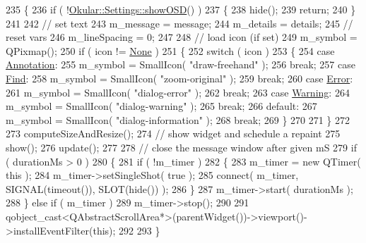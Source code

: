 \begin{DoxyCode}
235 \{
236     \textcolor{keywordflow}{if} ( !\hyperlink{classOkular_1_1Settings_ab6a3d4459b9ef5fa47cc7083968da797}{Okular::Settings::showOSD}() )
237     \{
238         hide();
239         \textcolor{keywordflow}{return};
240     \}
241 
242     \textcolor{comment}{// set text}
243     m\_message = message;
244     m\_details = details;
245     \textcolor{comment}{// reset vars}
246     m\_lineSpacing = 0;
247 
248     \textcolor{comment}{// load icon (if set)}
249     m\_symbol = QPixmap();
250     \textcolor{keywordflow}{if} ( icon != \hyperlink{classPageViewMessage_aeb83801b92379715663d5a7beaa2ae0ca4d49e997ceb24be7bda744d934b3e65e}{None} )
251     \{
252         \textcolor{keywordflow}{switch} ( icon )
253         \{
254             \textcolor{keywordflow}{case} \hyperlink{classPageViewMessage_aeb83801b92379715663d5a7beaa2ae0cacc210033b8c3a838c93af708e55cbbd0}{Annotation}:
255                 m\_symbol = SmallIcon( \textcolor{stringliteral}{"draw-freehand"} );
256                 \textcolor{keywordflow}{break};
257             \textcolor{keywordflow}{case} \hyperlink{classPageViewMessage_aeb83801b92379715663d5a7beaa2ae0cac5541921f6620602ebc759c6a149472a}{Find}:
258                 m\_symbol = SmallIcon( \textcolor{stringliteral}{"zoom-original"} );
259                 \textcolor{keywordflow}{break};
260             \textcolor{keywordflow}{case} \hyperlink{classPageViewMessage_aeb83801b92379715663d5a7beaa2ae0ca4fab3e3265e2d4386ce7b7ed21b086cc}{Error}:
261                 m\_symbol = SmallIcon( \textcolor{stringliteral}{"dialog-error"} );
262                 \textcolor{keywordflow}{break};
263             \textcolor{keywordflow}{case} \hyperlink{classPageViewMessage_aeb83801b92379715663d5a7beaa2ae0ca8d795d55732497f572dde8b9491ce280}{Warning}:
264                 m\_symbol = SmallIcon( \textcolor{stringliteral}{"dialog-warning"} );
265                 \textcolor{keywordflow}{break};
266             \textcolor{keywordflow}{default}:
267                 m\_symbol = SmallIcon( \textcolor{stringliteral}{"dialog-information"} );
268                 \textcolor{keywordflow}{break};
269         \}
270 
271     \}
272 
273     computeSizeAndResize();
274     \textcolor{comment}{// show widget and schedule a repaint}
275     show();
276     update();
277 
278     \textcolor{comment}{// close the message window after given mS}
279     \textcolor{keywordflow}{if} ( durationMs > 0 )
280     \{
281         \textcolor{keywordflow}{if} ( !m\_timer )
282         \{
283             m\_timer = \textcolor{keyword}{new} QTimer( \textcolor{keyword}{this} );
284             m\_timer->setSingleShot( \textcolor{keyword}{true} );
285             connect( m\_timer, SIGNAL(timeout()), SLOT(hide()) );
286         \}
287         m\_timer->start( durationMs );
288     \} \textcolor{keywordflow}{else} \textcolor{keywordflow}{if} ( m\_timer )
289         m\_timer->stop();
290 
291     qobject\_cast<QAbstractScrollArea*>(parentWidget())->viewport()->installEventFilter(\textcolor{keyword}{this});
292 
293 \}
\end{DoxyCode}
